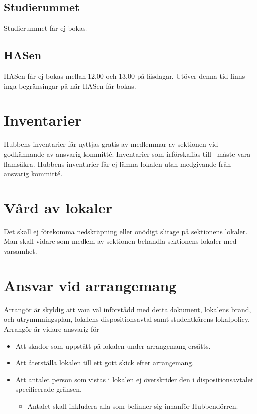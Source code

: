 \documentclass[11pt, includeaddress]{classes/cthit}
\begin{document}
\subsection{Studierummet}
Studierummet får ej bokas.

\subsection{HASen}
HASen får ej bokas mellan 12.00 och 13.00 på läsdagar. Utöver denna tid finns inga begränsingar på
när HASen får bokas.


\section{Inventarier}
Hubbens inventarier får nyttjas gratis av medlemmar av sektionen vid godkännande av ansvarig
kommitté. Inventarier som införskaffas till \HUBBEN\ måste vara flamsäkra.
Hubbens inventarier får ej lämna lokalen utan medgivande från ansvarig kommitté.

\section{Vård av lokaler}
Det skall ej förekomma nedskräpning eller onödigt slitage på sektionens lokaler.
Man skall vidare som medlem av sektionen behandla sektionens lokaler med varsamhet.

\section{Ansvar vid arrangemang}
Arrangör är skyldig att vara väl införstådd med detta dokument, lokalens brand­, och
utrymmningsplan, lokalens dispositionsavtal samt studentkårens lokalpolicy.
Arrangör är vidare ansvarig för
\begin{itemize}
	\item Att skador som uppstått på lokalen under arrangemang ersätts.
	\item Att återställa lokalen till ett gott skick efter arrangemang.
	\item Att antalet person som vistas i lokalen ej överskrider den i dispositionsavtalet specificerade
	gränsen.
	\begin{itemize}
	\item Antalet skall inkludera alla som befinner sig innanför Hubben­dörren.
	\end{itemize}
\end{itemize}
\end{document}
